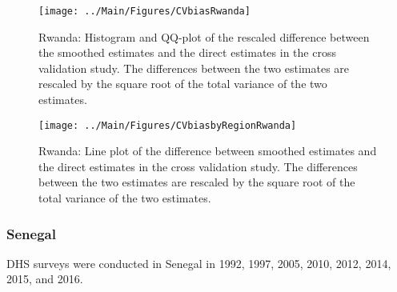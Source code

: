 \documentclass[12pt]{article}\usepackage[]{graphicx}\usepackage[]{color}
\newenvironment{knitrout}{}{} %
\begin{document}
\begin{knitrout}
\color{fgcolor}\begin{figure}[bht]

{\centering \texttt{[image: ../Main/Figures/CVbiasRwanda]} 

}

\caption[Rwanda]{Rwanda: Histogram and QQ-plot of the rescaled difference between the smoothed estimates and the direct estimates in the cross validation study. The differences between the two estimates are rescaled by the square root of the total variance of the two estimates.}\label{fig:unnamed-chunk-279}
\end{figure}


\end{knitrout}

\begin{knitrout}
\color{fgcolor}\begin{figure}[bht]

{\centering \texttt{[image: ../Main/Figures/CVbiasbyRegionRwanda]} 

}

\caption[Rwanda]{Rwanda: Line plot of the difference between smoothed estimates and the direct estimates in the cross validation study. The differences between the two estimates are rescaled by the square root of the total variance of the two estimates.}\label{fig:unnamed-chunk-280}
\end{figure}


\end{knitrout}


\clearpage
\subsubsection{Senegal}





DHS surveys were conducted in Senegal in 1992, 1997, 2005, 2010, 2012, 2014, 2015, and 2016.
\end{document}
